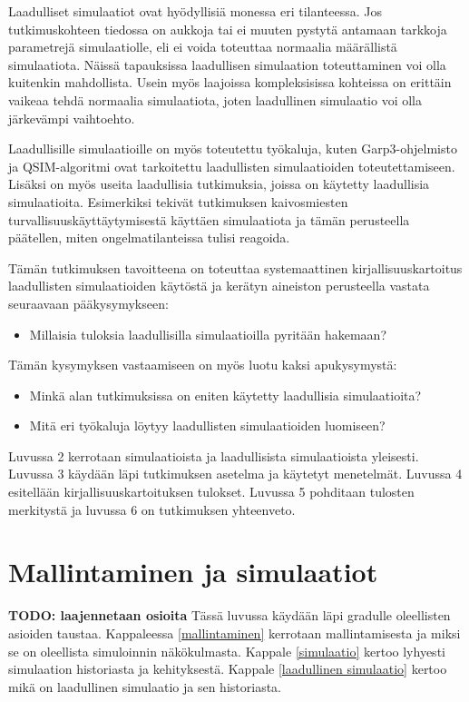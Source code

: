 \documentclass[utf8]{gradu3}
\begin{document}
Laadulliset simulaatiot ovat hyödyllisiä monessa eri tilanteessa. Jos tutkimuskohteen tiedossa on aukkoja tai ei muuten pystytä antamaan tarkkoja parametrejä simulaatiolle, eli ei voida toteuttaa normaalia määrällistä simulaatiota. Näissä tapauksissa laadullisen simulaation toteuttaminen voi olla kuitenkin mahdollista. Usein myös laajoissa kompleksisissa kohteissa on erittäin vaikeaa tehdä normaalia simulaatiota, joten laadullinen simulaatio voi olla järkevämpi vaihtoehto.

Laadullisille simulaatioille on myös toteutettu työkaluja, kuten Garp3-ohjelmisto \parencite{bredeweg2007garp3} ja QSIM-algoritmi \parencite{helgstrand2004qsim} ovat tarkoitettu laadullisten simulaatioiden toteutettamiseen. Lisäksi on myös useita laadullisia tutkimuksia, joissa on käytetty laadullisia simulaatioita. Esimerkiksi \textcite{cao2019depth} tekivät tutkimuksen kaivosmiesten turvallisuuskäyttäytymisestä käyttäen simulaatiota ja tämän perusteella päätellen, miten ongelmatilanteissa tulisi reagoida. 

Tämän tutkimuksen tavoitteena on toteuttaa systemaattinen kirjallisuuskartoitus laadullisten simulaatioiden käytöstä ja kerätyn aineiston perusteella vastata seuraavaan pääkysymykseen:
\begin{itemize}
    \item Millaisia tuloksia laadullisilla simulaatioilla pyritään hakemaan?
\end{itemize}

Tämän kysymyksen vastaamiseen on myös luotu kaksi apukysymystä:
\begin{itemize}
    \item Minkä alan tutkimuksissa on eniten käytetty laadullisia simulaatioita?
    \item Mitä eri työkaluja löytyy laadullisten simulaatioiden luomiseen?
\end{itemize}

Luvussa 2 kerrotaan simulaatioista ja laadullisista simulaatioista yleisesti. Luvussa 3 käydään läpi tutkimuksen asetelma ja käytetyt menetelmät. Luvussa 4 esitellään kirjallisuuskartoituksen tulokset. Luvussa 5 pohditaan tulosten merkitystä ja luvussa 6 on tutkimuksen yhteenveto.

\chapter{Mallintaminen ja simulaatiot}
\textbf{TODO: laajennetaan osioita}
Tässä luvussa käydään läpi gradulle oleellisten asioiden taustaa. 
Kappaleessa \ref{mallintaminen} kerrotaan mallintamisesta  ja miksi se on oleellista simuloinnin näkökulmasta. 
Kappale \ref{simulaatio} kertoo lyhyesti simulaation historiasta ja kehityksestä. 
Kappale \ref{laadullinen simulaatio} kertoo mikä on laadullinen simulaatio ja sen historiasta.
\end{document}
